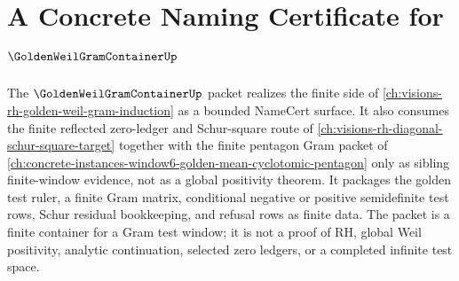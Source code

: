 \chapter{A Concrete Naming Certificate for $\GoldenWeilGramContainerUp$}
\label{ch:concrete-instances-golden-weil-gram-container-namecert}

The $\GoldenWeilGramContainerUp$ packet realizes the finite side of \autoref{ch:visions-rh-golden-weil-gram-induction} as a bounded NameCert surface. It also consumes the finite reflected zero-ledger and Schur-square route of \autoref{ch:visions-rh-diagonal-schur-square-target} together with the finite pentagon Gram packet of \autoref{ch:concrete-instances-window6-golden-mean-cyclotomic-pentagon} only as sibling finite-window evidence, not as a global positivity theorem. It packages the golden test ruler, a finite Gram matrix, conditional negative or positive semidefinite test rows, Schur residual bookkeeping, and refusal rows as finite data. The packet is a finite container for a Gram test window; it is not a proof of RH, global Weil positivity, analytic continuation, selected zero ledgers, or a completed infinite test space.

